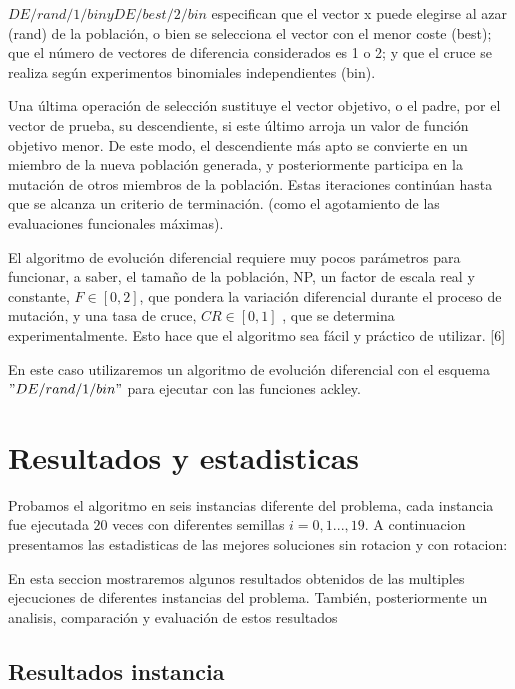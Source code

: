 \documentclass[10pt]{article}
\begin{document}
$ DE/rand/1/bin y DE/best/2/bin $ especifican que el vector x puede elegirse al azar (rand) de la población, o bien se selecciona el vector con el menor coste (best); que el número de vectores de diferencia considerados es 1 o 2; y que el cruce se realiza según experimentos binomiales independientes (bin).

Una última operación de selección sustituye el vector objetivo, o el padre, por el vector de prueba, su descendiente, si este último arroja un valor de función objetivo menor. De este modo, el descendiente más apto se convierte en un miembro de la nueva población generada, y posteriormente participa en la mutación de otros miembros de la población. Estas iteraciones continúan hasta que se alcanza un criterio de terminación. (como el agotamiento de las evaluaciones funcionales máximas).

El algoritmo de evolución diferencial requiere muy pocos parámetros para funcionar, a saber, el tamaño de la población, NP, un factor de escala real y constante, $F \in [0, 2] $, que pondera la variación diferencial durante el proceso de mutación, y una tasa de cruce, $ CR \in  [0, 1]$ , que se determina experimentalmente. Esto hace que el algoritmo sea fácil y práctico de utilizar. [6]

En este caso utilizaremos un algoritmo de evolución diferencial con el esquema $ " DE/rand/1/bin " $ para ejecutar con las funciones ackley.


\section{Resultados y estadisticas} %
 
Probamos el algoritmo en seis instancias diferente del problema, cada instancia fue ejecutada $20$ veces con diferentes semillas $i=0,1...,19$. A continuacion presentamos las estadisticas de las mejores soluciones sin rotacion y con rotacion:

\label{sec:Estadisticas}%

En esta seccion mostraremos algunos resultados obtenidos de las multiples ejecuciones de diferentes instancias del problema.%
También, posteriormente un analisis, comparación y evaluación de estos resultados%
\subsection{Resultados instancia}%

\label{subsec:}%
\end{document}
